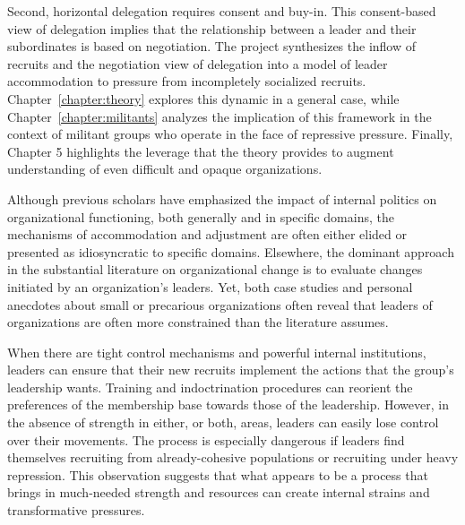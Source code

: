 Second, horizontal delegation requires consent and buy-in.  This consent-based view of delegation implies that the relationship between a leader and their subordinates is based on negotiation. The project synthesizes the inflow of recruits and the negotiation view of delegation into a model of leader accommodation to pressure from incompletely socialized recruits. Chapter~\ref{chapter:theory} explores this dynamic in a general case, while Chapter~\ref{chapter:militants} analyzes the implication of this framework in the context of militant groups who operate in the face of repressive pressure. Finally, Chapter 5 highlights the leverage that the theory provides to augment understanding of even difficult and opaque organizations. 
 
Although previous scholars have emphasized the impact of internal
politics on organizational functioning, both generally and in specific
domains, the mechanisms of accommodation and adjustment are often
either elided or presented as idiosyncratic to specific domains.
Elsewhere, the dominant approach in the substantial literature on
organizational change is to evaluate changes initiated by an
organization's leaders. Yet, both case studies and personal anecdotes
about small or precarious organizations  often reveal that leaders of
organizations are often more constrained than the literature
assumes.

When there are tight control mechanisms and powerful internal institutions,
leaders can ensure that their new recruits implement the actions that the
group’s leadership wants. Training and indoctrination procedures can
reorient the preferences of the membership base towards those of the
leadership. However, in the absence of strength in either, or both,
areas, leaders can easily lose control over their movements. The
process is especially dangerous if leaders find themselves recruiting
from already-cohesive populations or recruiting under heavy
repression.  This observation suggests that what appears to
be a process that brings in much-needed strength and resources can
create internal strains and transformative pressures.


